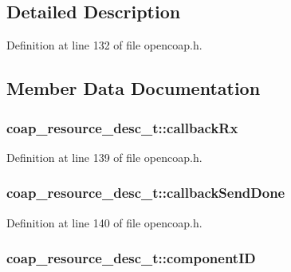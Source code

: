 \subsection{Detailed Description}


Definition at line 132 of file opencoap.\+h.



\subsection{Member Data Documentation}
\subsubsection[{\texorpdfstring{callback\+Rx}{callbackRx}}]{ coap\+\_\+resource\+\_\+desc\+\_\+t\+::callback\+Rx}\hypertarget{structcoap__resource__desc__t_a32c5317762d028b57928be96f89a4395}{}\label{structcoap__resource__desc__t_a32c5317762d028b57928be96f89a4395}


Definition at line 139 of file opencoap.\+h.

\subsubsection[{\texorpdfstring{callback\+Send\+Done}{callbackSendDone}}]{ coap\+\_\+resource\+\_\+desc\+\_\+t\+::callback\+Send\+Done}\hypertarget{structcoap__resource__desc__t_ad4ccfb979e92f1a4575f4641414880de}{}\label{structcoap__resource__desc__t_ad4ccfb979e92f1a4575f4641414880de}


Definition at line 140 of file opencoap.\+h.

\subsubsection[{\texorpdfstring{component\+ID}{componentID}}]{ coap\+\_\+resource\+\_\+desc\+\_\+t\+::component\+ID}\hypertarget{structcoap__resource__desc__t_af55b65f7e045f7c35bb2cee3d7180e56}{}\label{structcoap__resource__desc__t_af55b65f7e045f7c35bb2cee3d7180e56}



